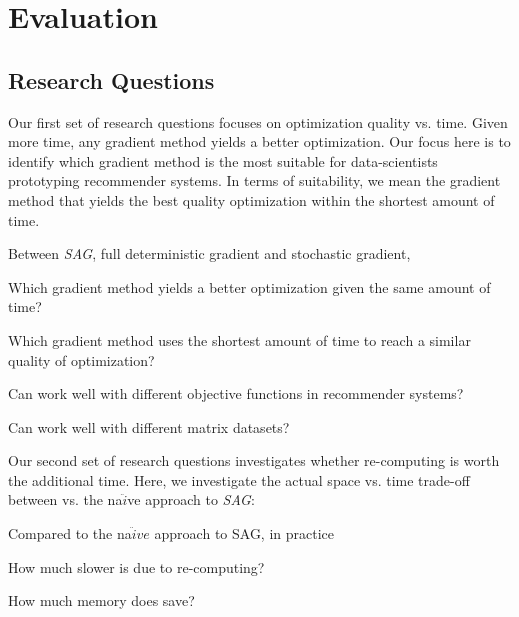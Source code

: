 \section{Evaluation}


\subsection{Research Questions}

Our first set of research questions focuses on optimization quality vs. time.
Given more time, any gradient method yields a better optimization.  
Our focus here is to identify which gradient method is the most suitable for data-scientists prototyping recommender systems.
In terms of suitability, we mean the gradient method that yields the best quality optimization within the shortest amount of time.

Between \emph{SAG}, full deterministic gradient and stochastic gradient,
\begin{sloppy}
\begin{compactenum}
\item Which gradient method yields a better optimization given the same amount of time?
\item Which gradient method uses the shortest amount of time to reach a similar quality of optimization?
\item Can \tool work well with different objective functions in recommender systems?
\item Can \tool work well with different matrix datasets?
\end{compactenum}
\end{sloppy}


Our second set of research questions investigates whether re-computing is worth the additional time.
Here, we investigate the actual space vs. time trade-off between \tool vs. the na$\ddot{i}$ve approach to \emph{SAG}:

Compared to the na$\ddot{i}ve$ approach to SAG, in practice
\begin{sloppy}
\begin{compactenum}
\setcounter{enumi}{4}
\item How much slower is \tool due to re-computing?
\item How much memory does \tool save?
\end{compactenum}
\end{sloppy}



